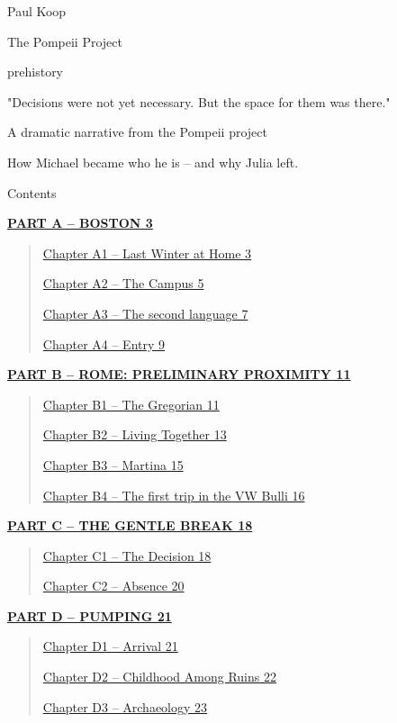 \documentclass[
]{article}
\author{}
\date{}
\begin{document}
{
\setcounter{tocdepth}{3}
\tableofcontents
}
Paul Koop

The Pompeii Project

prehistory

"Decisions were not yet necessary. But the space for them was there."

A dramatic narrative from the Pompeii project

How Michael became who he is -- and why Julia left.

Contents

\hyperref[part-a-boston]{\textbf{PART A -- BOSTON 3}}

\begin{quote}
\hyperref[chapter-a1-last-winter-at-home]{Chapter A1 -- Last Winter at Home 3}

\hyperref[chapter-a2-the-campus]{Chapter A2 -- The Campus 5}

\hyperref[chapter-a3-the-second-language]{Chapter A3 -- The second language 7}

\hyperref[chapter-a4-entry]{Chapter A4 -- Entry 9}
\end{quote}

\hyperref[part-b-rome-preliminary-proximity]{\textbf{PART B -- ROME: PRELIMINARY PROXIMITY 11}}

\begin{quote}
\hyperref[chapter-b1-gregorian-calendar]{Chapter B1 -- The Gregorian 11}

\hyperref[kapitel-b2-living-together]{Chapter B2 -- Living Together 13}

\hyperref[chapter-b3-martina]{Chapter B3 -- Martina 15}

\hyperref[chapter-b4-the-first-trip-in-the-vw-bulli]{Chapter B4 -- The first trip in the VW Bulli 16}
\end{quote}

\hyperref[part-c-the-gentle-break]{\textbf{PART C -- THE GENTLE BREAK 18}}

\begin{quote}
\hyperref[chapter-c1-the-decision]{Chapter C1 -- The Decision 18}

\hyperref[chapter-c2-absence]{Chapter C2 -- Absence 20}
\end{quote}

\hyperref[part-d-pumping]{\textbf{PART D -- PUMPING 21}}

\begin{quote}
\hyperref[chapter-d1-arrival]{Chapter D1 -- Arrival 21}

\hyperref[chapter-d2-childhood-among-ruins]{Chapter D2 -- Childhood Among Ruins 22}

\hyperref[chapter-d3-archaeology]{Chapter D3 -- Archaeology 23}
\end{quote}
\end{document}
